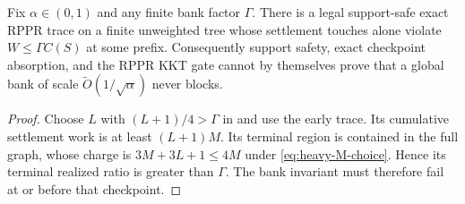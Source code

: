 \begin{corollary}
\label{cor:no-policy-blind-bank}
Fix $\alpha\in(0,1)$ and any finite bank factor $\Gamma$.  There is a legal
support-safe exact RPPR trace on a finite unweighted tree whose settlement
touches alone violate $W\leq\Gamma C(S)$ at some prefix.  Consequently
support safety, exact checkpoint absorption, and the RPPR KKT gate cannot by
themselves prove that a global bank of scale
$\widetilde O(1/\sqrt\alpha)$ never blocks.
\end{corollary}

\begin{proof}
Choose $L$ with $(L+1)/4>\Gamma$ in
 and use the early trace.  Its cumulative
settlement work is at least $(L+1)M$.  Its terminal region is contained in
the full graph, whose charge is $3M+3L+1\leq4M$ under
\eqref{eq:heavy-M-choice}.  Hence its terminal realized ratio is greater
than $\Gamma$.  The bank invariant must therefore fail at or before that
checkpoint.
\end{proof}
